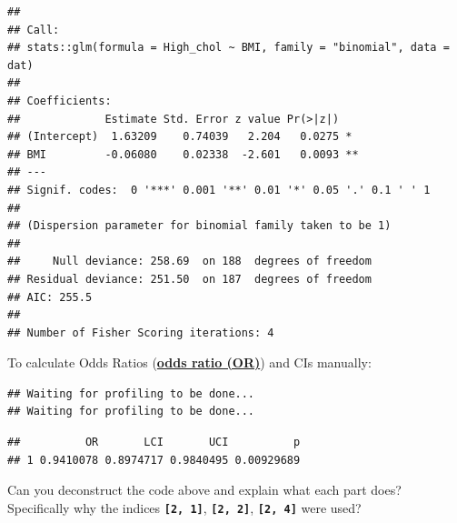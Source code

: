 \documentclass[
]{book}
\newenvironment{Shaded}{\begin{snugshade}}{\end{snugshade}}
\newcommand{\AttributeTok}[1]{\textcolor[rgb]{0.13,0.29,0.53}{#1}}
\newcommand{\DecValTok}[1]{\textcolor[rgb]{0.00,0.00,0.81}{#1}}
\newcommand{\FunctionTok}[1]{\textcolor[rgb]{0.13,0.29,0.53}{\textbf{#1}}}
\newcommand{\NormalTok}[1]{#1}
\newcommand{\SpecialCharTok}[1]{\textcolor[rgb]{0.81,0.36,0.00}{\textbf{#1}}}
\begin{document}
\begin{verbatim}
## 
## Call:
## stats::glm(formula = High_chol ~ BMI, family = "binomial", data = dat)
## 
## Coefficients:
##             Estimate Std. Error z value Pr(>|z|)   
## (Intercept)  1.63209    0.74039   2.204   0.0275 * 
## BMI         -0.06080    0.02338  -2.601   0.0093 **
## ---
## Signif. codes:  0 '***' 0.001 '**' 0.01 '*' 0.05 '.' 0.1 ' ' 1
## 
## (Dispersion parameter for binomial family taken to be 1)
## 
##     Null deviance: 258.69  on 188  degrees of freedom
## Residual deviance: 251.50  on 187  degrees of freedom
## AIC: 255.5
## 
## Number of Fisher Scoring iterations: 4
\end{verbatim}

To calculate Odds Ratios (\textbf{\hyperref[acronyms_OR]{odds ratio (OR)}}) and CIs manually:

\begin{Shaded}
\end{Shaded}

\begin{verbatim}
## Waiting for profiling to be done...
## Waiting for profiling to be done...
\end{verbatim}

\begin{verbatim}
##          OR       LCI       UCI          p
## 1 0.9410078 0.8974717 0.9840495 0.00929689
\end{verbatim}

Can you deconstruct the code above and explain what each part does? Specifically why the indices \textbf{\texttt{{[}2,\ 1{]}}}, \textbf{\texttt{{[}2,\ 2{]}}}, \textbf{\texttt{{[}2,\ 4{]}}} were used?
\end{document}
